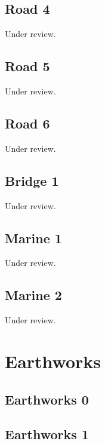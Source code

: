 \documentclass{scrartcl}
\begin{document}
\subsection{Road 4} %
\label{sec:road_4}
Under review.%
\clearpage

\subsection{Road 5} %
\label{sec:road_5}
Under review.%
\clearpage

\subsection{Road 6} %
\label{sec:road_6}
Under review.%
\clearpage

\subsection{Bridge 1} %
\label{sec:bridge_1}
Under review.%
\clearpage

\subsection{Marine 1} %
\label{sec:marine_1}
Under review.%
\clearpage

\subsection{Marine 2} %
\label{sec:marine_2}
Under review.%
\clearpage

\section{Earthworks}

\subsection{Earthworks 0}
\label{sec:earth_0}
\clearpage

\subsection{Earthworks 1}
\label{sec:earth_1}
\clearpage
\end{document}
